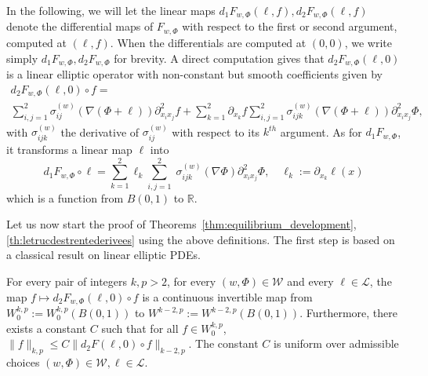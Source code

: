 \documentclass[10pt]{amsart}
\theoremstyle{definition}\newtheorem{defi}[theo]{Definition}\newtheorem{rema}[theo]{Remark}\newtheorem{exam}[theo]{Example}\newtheorem{exem}[theo]{Example}\newtheorem{nota}[theo]{Notation}
\newcommand{\R}{\mathbb{R}}
\newcommand{\clL}{\mathcal{L}}
\newcommand{\clW}{\mathcal{W}}
\newcommand{\norm}[1]{\lVert #1 \rVert}
\begin{document}
In the following, we will let the linear maps $d_1 F_{w,\Phi}(\ell,f),d_2F_{w,\Phi}(\ell,f)$ denote the differential maps of $F_{w,\Phi}$ with respect to the first or second argument, computed at $(\ell,f)$. When the differentials are computed at $(0,0)$, we write simply $d_1F_{w,\Phi}, d_2 F_{w,\Phi}$ for brevity. A direct computation gives that $d_2 F_{w,\Phi}(\ell,0)$ is a linear elliptic operator with non-constant but smooth coefficients given by
\begin{multline}\label{eq:d2F}
d_2 F_{w,\Phi}(\ell,0)\circ f=\\
\sum_{i,j=1}^2\sigma^{(w)}_{ij}(\nabla(\Phi+\ell))\partial^2_{x_i x_j}f+\sum_{k=1}^2\partial_{x_k}f\sum_{i,j=1}^2\sigma^{(w)}_{ijk}(\nabla(\Phi+\ell))\partial^2_{x_i x_j}\Phi,
\end{multline}
with $\sigma^{(w)}_{ijk}$ the derivative of $\sigma^{(w)}_{ij}$ with respect to its $k^{th}$ argument. As for $d_1 F_{w,\Phi}$, it transforms a linear map $\ell$ into
\begin{equation}\label{eq:d1F}
d_1 F_{w,\Phi}\circ \ell=\sum_{k=1}^2\ell_k\sum_{i,j=1}^2\;\sigma^{(w)}_{ijk}(\nabla\Phi)\partial^2_{x_i x_j}\Phi, \quad \ell_k:=\partial_{x_k}\ell(x)
\end{equation}
which is a function from $B(0,1)$ to $\R$.


Let us now start the proof of
Theorems~\ref{thm:equilibrium_development}, \ref{th:letrucdestrentederivees} using the above definitions. The first step is based on a classical result on linear elliptic PDEs.

\begin{prop}\label{claim:inversibilite}
For every pair of integers $k,p>2$, for every
$(w, \Phi)\in\clW$ and every $\ell \in \clL$, the map $f\mapsto d_2 F_{w,\Phi}(\ell,0)\circ f$ is a continuous invertible map from $W^{k, p}_0:=W^{k, p}_0(B(0,1))$ to $W^{k-2, p}:=W^{k-2, p}(B(0,1))$. Furthermore, there exists a constant $C$ such that for all $f \in W^{k, p}_0$, $ \norm{ f}_{{k, p}} \leq C \norm{d_2 F(\ell,0)\circ f}_{{k-2, p}}$. The constant $C$ is uniform over admissible choices $(w, \Phi)\in \clW, \ell\in\clL$.
\end{prop}
\end{document}
